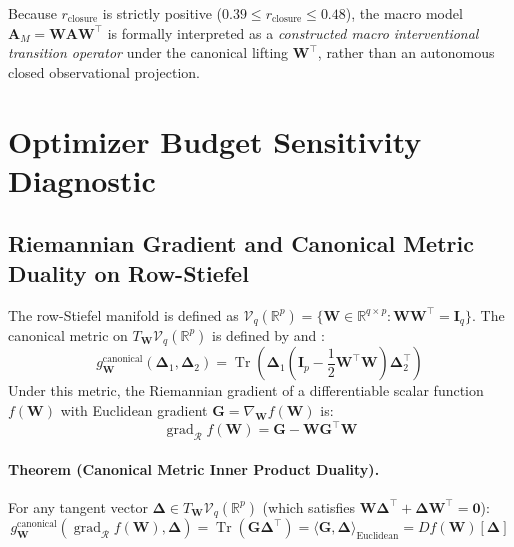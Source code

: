 \documentclass[12pt]{article}
\begin{document}
Because $r_{\text{closure}}$ is strictly positive ($0.39 \le r_{\text{closure}} \le 0.48$), the macro model $\mathbf{A}_M = \mathbf{W}\mathbf{A}\mathbf{W}^\top$ is formally interpreted as a \emph{constructed macro interventional transition operator} under the canonical lifting $\mathbf{W}^\top$, rather than an autonomous closed observational projection.

\section{Optimizer Budget Sensitivity Diagnostic}
\label{app:stiefel_opt}

\subsection{Riemannian Gradient and Canonical Metric Duality on Row-Stiefel}
The row-Stiefel manifold is defined as $\mathcal{V}_q(\mathbb{R}^p) = \{ \mathbf{W} \in \mathbb{R}^{q \times p} : \mathbf{W}\mathbf{W}^\top = \mathbf{I}_q \}$. The canonical metric on $T_{\mathbf{W}}\mathcal{V}_q(\mathbb{R}^p)$ is defined by \citet{edelman1998geometry} and \citet{absil2008optimization}:
\begin{equation}
g_{\mathbf{W}}^{\text{canonical}}(\mathbf{\Delta}_1, \mathbf{\Delta}_2) = \operatorname{Tr}\left( \mathbf{\Delta}_1 \left(\mathbf{I}_p - \frac{1}{2}\mathbf{W}^\top \mathbf{W}\right) \mathbf{\Delta}_2^\top \right)
\end{equation}
Under this metric, the Riemannian gradient of a differentiable scalar function $f(\mathbf{W})$ with Euclidean gradient $\mathbf{G} = \nabla_{\mathbf{W}} f(\mathbf{W})$ is:
\begin{equation}
\operatorname{grad}_{\mathcal{R}} f(\mathbf{W}) = \mathbf{G} - \mathbf{W}\mathbf{G}^\top \mathbf{W}
\end{equation}

\paragraph{Theorem (Canonical Metric Inner Product Duality).}
For any tangent vector $\mathbf{\Delta} \in T_{\mathbf{W}}\mathcal{V}_q(\mathbb{R}^p)$ (which satisfies $\mathbf{W}\mathbf{\Delta}^\top + \mathbf{\Delta}\mathbf{W}^\top = \mathbf{0}$):
\begin{equation}
g_{\mathbf{W}}^{\text{canonical}}(\operatorname{grad}_{\mathcal{R}} f(\mathbf{W}), \mathbf{\Delta}) = \operatorname{Tr}(\mathbf{G}\mathbf{\Delta}^\top) = \langle \mathbf{G}, \mathbf{\Delta} \rangle_{\text{Euclidean}} = D f(\mathbf{W})[\mathbf{\Delta}]
\end{equation}
\end{document}
